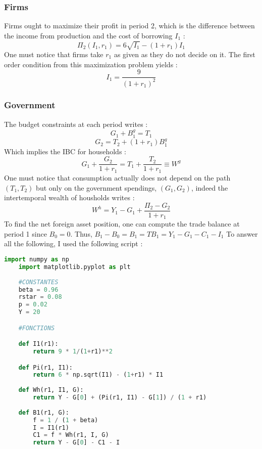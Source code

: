 \documentclass{article}
\begin{document}
\subsubsection*{Firms}
Firms ought to maximize their profit in period 2, which is the difference between the income from production and the cost of borrowing $I_1$ : 
\begin{equation}
    \Pi_2(I_1, r_1)  = 6\sqrt{I_1} - (1+r_1) I_1
\end{equation}
One must notice that firms take $r_1$ as given as they do not decide on it.\newline
The first order condition from this maximization problem yields :
\begin{equation}
    I_1  = \frac{9}{(1+r_1)^2}
\end{equation}
\subsubsection*{Government}
The budget constraints at each period writes :
\begin{equation}
    G_1 + B_1^g = T_1
\end{equation}
\begin{equation}
    G_2  = T_2 + (1+r_1) B_1^g
\end{equation}
Which implies the IBC for households :
\begin{equation}
    G_1 + \frac{G_2}{1+r_1}  = T_1 + \frac{T_2}{1+r_1} \equiv W^g
\end{equation}
One must notice that consumption actually does not depend on the path $(T_1, T_2)$ but only on the government spendings, $(G_1, G_2)$, indeed the intertemporal wealth of housholds writes :
\begin{equation}
    W^h  = Y_1 - G_1 + \frac{\Pi_2 - G_2}{1+r_1}
\end{equation}
To find the net foreign asset position, one can compute the trade balance at period 1 since $B_0 = 0$.\newline
Thus, $B_1 - B_0 = B_1 = TB_1 = Y_1 - G_1 - C_1 - I_1$\newline
To answer all the following, I used the following script :
\begin{lstlisting}[language=Python, label=python_code]
    import numpy as np
    import matplotlib.pyplot as plt
    
    #CONSTANTES
    beta = 0.96
    rstar = 0.08
    p = 0.02
    Y = 20

    #FONCTIONS

    def I1(r1):
        return 9 * 1/(1+r1)**2

    def Pi(r1, I1):
        return 6 * np.sqrt(I1) - (1+r1) * I1
    
    def Wh(r1, I1, G):
        return Y - G[0] + (Pi(r1, I1) - G[1]) / (1 + r1)
    
    def B1(r1, G):
        f = 1 / (1 + beta)
        I = I1(r1)
        C1 = f * Wh(r1, I, G)
        return Y - G[0] - C1 - I
\end{lstlisting}
\end{document}
